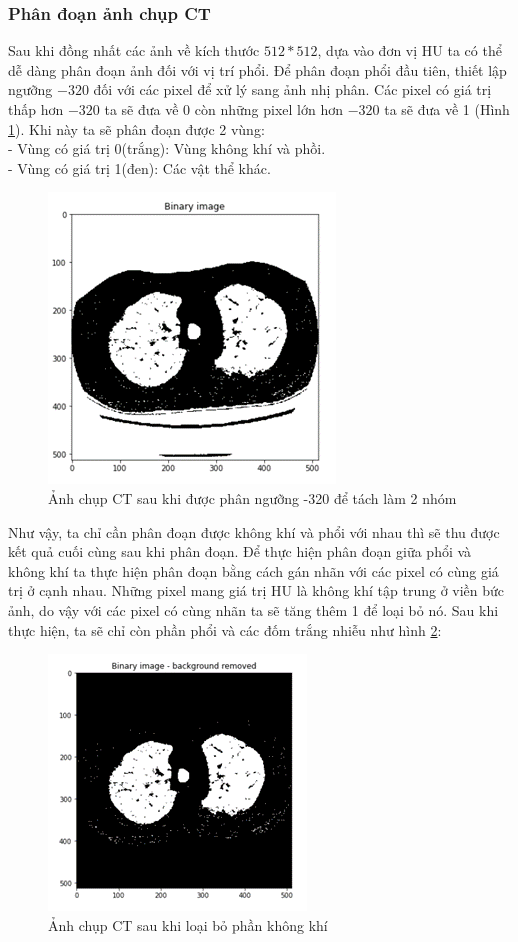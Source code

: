 \subsubsection{Phân đoạn ảnh chụp CT}
Sau khi đồng nhất các ảnh về kích thước $512 * 512$, dựa vào đơn vị HU ta có thể dễ dàng phân đoạn ảnh đối với vị trí phổi. Để phân đoạn phổi đầu tiên, thiết lập ngưỡng $-320$ đối với các pixel để xử lý sang ảnh nhị phân. Các pixel có giá trị thấp hơn $-320$ ta sẽ đưa về 0 còn những pixel lớn hơn $-320$ ta sẽ đưa về 1 (Hình \ref{fig:data7}). Khi này ta sẽ phân đoạn được 2 vùng:\\
\tab - Vùng có giá trị 0(trắng): Vùng không khí và phồi.\\
\tab - Vùng có giá trị 1(đen): Các vật thể khác.\par
\begin{figure}[ht!]
\centerline{\includegraphics[scale=0.5]{images/data7.png}}
\caption{Ảnh chụp CT sau khi được phân ngưỡng -320 để tách làm 2 nhóm}
\label{fig:data7}
\end{figure}
Như vậy, ta chỉ cần phân đoạn được không khí và phổi với nhau thì sẽ thu được kết quả cuối cùng sau khi phân đoạn. Để thực hiện phân đoạn giữa phổi và không khí ta thực hiện phân đoạn bằng cách gán nhãn với các pixel có cùng giá trị ở cạnh nhau. Những pixel mang giá trị HU là không khí tập trung ở viền bức ảnh, do vậy với các pixel có cùng nhãn ta sẽ tăng thêm 1 để loại bỏ nó. Sau khi thực hiện, ta sẽ chỉ còn phần phổi và các đốm trắng nhiễu như hình \ref{fig:data8}:\par
\begin{figure}[ht!]
\centerline{\includegraphics[scale=0.6]{images/data8.png}}
\caption{Ảnh chụp CT sau khi loại bỏ phần không khí}
\label{fig:data8}
\end{figure}

